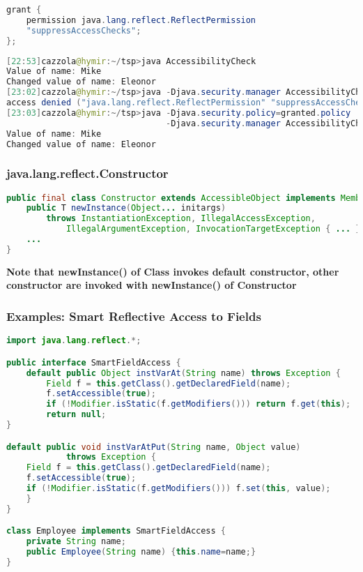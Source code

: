 \begin{lstlisting}[language=Java]
grant {
	permission java.lang.reflect.ReflectPermission
	"suppressAccessChecks";
};
\end{lstlisting}

\begin{lstlisting}[language=Java]
[22:53]cazzola@hymir:~/tsp>java AccessibilityCheck
Value of name: Mike
Changed value of name: Eleonor
[23:02]cazzola@hymir:~/tsp>java -Djava.security.manager AccessibilityCheck
access denied ("java.lang.reflect.ReflectPermission" "suppressAccessChecks")
[23:03]cazzola@hymir:~/tsp>java -Djava.security.policy=granted.policy
                                -Djava.security.manager AccessibilityCheck
Value of name: Mike
Changed value of name: Eleonor
\end{lstlisting}

\subsubsection{java.lang.reflect.Constructor}

\begin{lstlisting}[language=Java]
public final class Constructor extends AccessibleObject implements Member {
	public T newInstance(Object... initargs)
		throws InstantiationException, IllegalAccessException,
			IllegalArgumentException, InvocationTargetException { ... }
	...
}
\end{lstlisting}

\textbf{Note that newInstance() of Class invokes default constructor, other constructor are invoked with newInstance() of Constructor}

\subsubsection{Examples: Smart Reflective Access to Fields}

\begin{lstlisting}[language=Java]
import java.lang.reflect.*;

public interface SmartFieldAccess {
	default public Object instVarAt(String name) throws Exception {
		Field f = this.getClass().getDeclaredField(name);
		f.setAccessible(true);
		if (!Modifier.isStatic(f.getModifiers())) return f.get(this);
		return null;
}

default public void instVarAtPut(String name, Object value)
			throws Exception {
	Field f = this.getClass().getDeclaredField(name);
	f.setAccessible(true);
	if (!Modifier.isStatic(f.getModifiers())) f.set(this, value);
	}
}

class Employee implements SmartFieldAccess {
	private String name;
	public Employee(String name) {this.name=name;}
}
\end{lstlisting}

